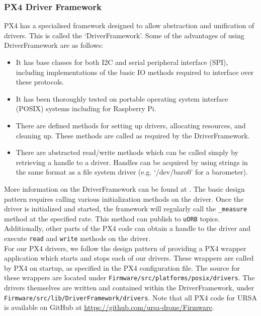 \documentclass[capstone_report.tex]{subfiles}
\begin{document}
    \subsubsection{PX4 Driver Framework}
    PX4 has a specialised framework designed to allow abstraction and unification of drivers. This is called the `DriverFramework'. Some of the advantages of using DriverFramework are as follows:
    \begin{itemize}
        \item It has base classes for both I2C and serial peripheral interface (SPI), including implementations of the basic IO methods required to interface over these protocols.
        \item It has been thoroughly tested on portable operating system interface (POSIX) systems including for Raspberry Pi.
        \item There are defined methods for setting up drivers, allocating resources, and cleaning up. These methods are called as required by the DriverFramework.
        \item There are abstracted read/write methods which can be called simply by retrieving a handle to a driver. Handles can be acquired by using strings in the same format as a file system driver (e.g. `/dev/baro0' for a barometer).
    \end{itemize}

    More information on the DriverFramework can be found at \cite{dfoverview}. The basic design pattern requires calling various initialization methods on the driver. Once the driver is initialized and started, the framework will regularly call the \texttt{\_measure} method at the specified rate. This method can publish to \texttt{uORB} topics. Additionally, other parts of the PX4 code can obtain a handle to the driver and execute \texttt{read} and \texttt{write} methods on the driver. \\

    For our PX4 drivers, we follow the design pattern of providing a PX4 wrapper application which starts and stops each of our drivers. These wrappers are called by PX4 on startup, as specified in the PX4 configuration file. The source for these wrappers are located under \texttt{Firmware/src/platforms/posix/drivers}. The drivers themselves are written and contained within the DriverFramework, under \texttt{Firmware/src/lib/DriverFramework/drivers}. Note that all PX4 code for URSA is available on GitHub at \url{https://github.com/ursa-drone/Firmware}.
\end{document}

